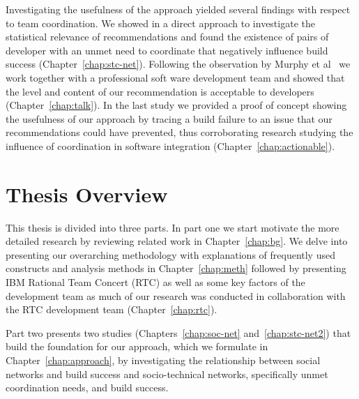 Investigating the usefulness of the approach yielded several findings with respect to team coordination.
We showed in a direct approach to investigate the statistical relevance of recommendations and found the existence of pairs of developer with an unmet need to coordinate that negatively influence build success (Chapter~\ref{chap:stc-net}).
Following the observation by Murphy et al~\cite{murphy:rsse:2010} we work together with a professional soft ware development team and showed that the level and content of our recommendation is acceptable to developers (Chapter~\ref{chap:talk}).
In the last study we provided a proof of concept showing the usefulness of our approach by tracing a build failure to an issue that our recommendations could have prevented, thus corroborating research studying the influence of coordination in software integration (Chapter~\ref{chap:actionable}).

\section{Thesis Overview}
This thesis is divided into three parts.
In part one we start motivate the more detailed research by reviewing related work in Chapter~\ref{chap:bg}.
We delve into presenting our overarching methodology with explanations of frequently used constructs and analysis methods in Chapter~\ref{chap:meth} followed by presenting IBM Rational Team Concert (RTC) as well as some key factors of the development team as much of our research was conducted in collaboration with the RTC development team (Chapter~\ref{chap:rtc}).

Part two presents two studies (Chapters~\ref{chap:soc-net} and~\ref{chap:stc-net2}) that build the foundation for our approach, which we formulate in Chapter~\ref{chap:approach}, by investigating the relationship between social networks and build success and socio-technical networks, specifically unmet coordination needs, and build success.

